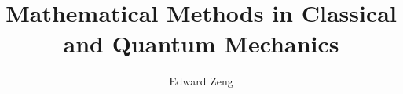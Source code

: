 
\title{Mathematical Methods in Classical and Quantum Mechanics}
\author{Edward Zeng}


    \maketitle
    \tableofcontents
    \newpage
    \pagestyle{fancy}
    



